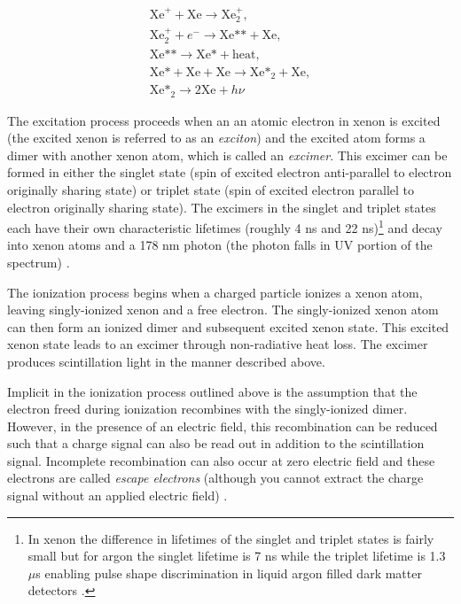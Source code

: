 \begin{equation}
        \label{eqn:ionization_production}
        \begin{gathered}
                \textrm{Xe}^+ + \textrm{Xe} \rightarrow \textrm{Xe}_2^+, \\
                \textrm{Xe}_2^+ + e^- \rightarrow \textrm{Xe**} + \textrm{Xe}, \\
                \textrm{Xe**} \rightarrow \textrm{Xe*} + \textrm{heat}, \\
                \textrm{Xe*} + \textrm{Xe} + \textrm{Xe} \rightarrow \textrm{Xe*}_2 + \textrm{Xe}, \\
                \textrm{Xe*}_2 \rightarrow 2\textrm{Xe} + h \nu
        \end{gathered}
\end{equation}

The excitation process proceeds when an an atomic electron in xenon is excited (the excited xenon is referred to as an \textit{exciton}) and the excited atom forms a dimer with another xenon atom, which is called an \textit{excimer}.  This excimer can be formed in either the singlet state (spin of excited electron anti-parallel to electron originally sharing state) or triplet state (spin of excited electron parallel to electron originally sharing state).  The excimers in the singlet and triplet states each have their own characteristic lifetimes (roughly 4 ns and 22 ns)\footnote{In xenon the difference in lifetimes of the singlet and triplet states is fairly small but for argon the singlet lifetime is 7 ns while the triplet lifetime is 1.3 $\mu$s enabling pulse shape discrimination in liquid argon filled dark matter detectors \cite{heindl2011table, amaudruz2017first}.} and decay into xenon atoms and a 178 nm photon (the photon falls in UV portion of the spectrum) \cite{hitachi1983effect, doke2002absolute}.  

The ionization process begins when a charged particle ionizes a xenon atom, leaving singly-ionized xenon and a free electron.  The singly-ionized xenon atom can then form an ionized dimer and subsequent excited xenon state.  This excited xenon state leads to an excimer through non-radiative heat loss.  The excimer produces scintillation light in the manner described above.

Implicit in the ionization process outlined above is the assumption that the electron freed during ionization recombines with the singly-ionized dimer.  However, in the presence of an electric field, this recombination can be reduced such that a charge signal can also be read out in addition to the scintillation signal.  Incomplete recombination can also occur at zero electric field and these electrons are called \textit{escape electrons} (although you cannot extract the charge signal without an applied electric field) \cite{doke2002absolute}.


